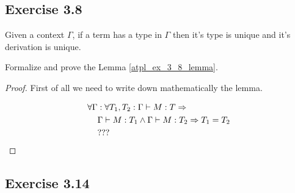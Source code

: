 \documentclass[12pt,a4paper,oneside]{book}
\begin{document}
\subsection{Exercise 3.8}

\begin{lemma}
    \label{atpl_ex_3_8_lemma}
    Given a context $\Gamma$, if a term has a type in $\Gamma$ then it's type is unique and it's derivation is unique.
\end{lemma}

\begin{exercise}
    Formalize and prove the Lemma \ref{atpl_ex_3_8_lemma}.

    \begin{proof}
        First of all we need to write down mathematically the lemma.

        \begin{equation*}
        \begin{split}
        \forall \Gamma &\mathrel{:} \forall T_1, T_2 \mathrel{:} \Gamma \vdash M : T \Rightarrow \\
        &\Gamma \vdash M:T_1 \land \Gamma \vdash M:T_2 \Rightarrow T_1 = T_2 \\
        & ???
        \end{split}
        \end{equation*}
    \end{proof}
\end{exercise}

\subsection{Exercise 3.14}
\end{document}
